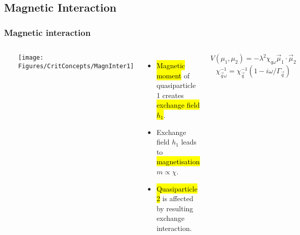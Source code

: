 \subsection{Magnetic Interaction}
\begin{frame}[label=MagnInter]
\frametitle{Magnetic interaction}

\begin{columns}[t]
\centerline{~}
\centerline{\texttt{[image: \\Figures/CritConcepts/MagnInter1]}}
\begin{itemize}
\item<2->
\hl{Magnetic moment} of quasiparticle 1 creates \hl{exchange field $h_1$}.

\item<3->
Exchange field $h_1$ leads to \hl{magnetisation} $m \propto \chi$. 

\item<4->
\hl{Quasiparticle 2} is affected by resulting exchange interaction.
\end{itemize}

\centerline{}
\[V(\mu_1, \mu_2) = -\lambda^2 \chi_{q\omega} \vec\mu_1 \cdot \vec\mu_2\]
\[\chi_{\vec q \omega}^{-1} = \chi_\vec q^{-1} \left(1-i\omega/\Gamma_\vec q\right) \]

\end{columns}

\vspace{0.5cm}
\end{frame}



